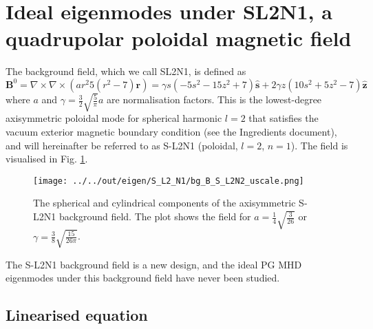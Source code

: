 \section{Ideal eigenmodes under SL2N1, a quadrupolar poloidal magnetic field}

The background field, which we call SL2N1, is defined as
\[
    \mathbf{B}^0 = \nabla\times \nabla\times \left(a r^2 5(r^2 - 7) \mathbf{r}\right) = \gamma s \left(- 5 s^{2} - 15 z^{2} + 7\right) \hat{\mathbf{s}} + 2 \gamma z \left(10 s^{2} + 5 z^{2} - 7\right) \hat{\mathbf{z}}
\]
where $a$ and $\gamma = \frac{3}{2} \sqrt{\frac{5}{\pi}} a$ are normalisation factors. This is the lowest-degree axisymmetric poloidal mode for spherical harmonic $l=2$ that satisfies the vacuum exterior magnetic boundary condition (see the Ingredients document), and will hereinafter be referred to as S-L2N1 (poloidal, $l=2$, $n=1$). The field is visualised in Fig. \ref{fig:bg-S-L2N1}.
\begin{figure}[htbp]
    \centering
    \texttt{[image: ../../out/eigen/S\_L2\_N1/bg\_B\_S\_L2N2\_uscale.png]}
    \caption{The spherical and cylindrical components of the axisymmetric S-L2N1 background field. The plot shows the field for $a=\frac{1}{4}\sqrt{\frac{3}{26}}$ or $\gamma = \frac{3}{8} \sqrt{\frac{15}{26\pi}}$.}
    \label{fig:bg-S-L2N1}
\end{figure}

The S-L2N1 background field is a new design, and the ideal PG MHD eigenmodes under this background field have never been studied.

\subsection{Linearised equation}

